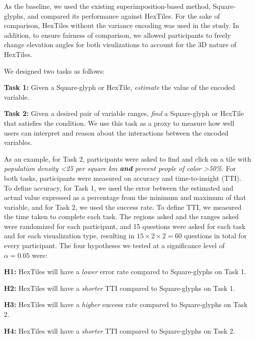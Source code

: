 As the baseline, we used the existing superimposition-based method, Square-glyphs, and compared its performance against HexTiles.
%
For the sake of comparison, HexTiles without the variance encoding was used in the study.
%
In addition, to ensure fairness of comparison, we allowed participants to freely change elevation angles for both visulizations to account for the 3D nature of HexTiles.


We designed two tasks as follows: 
\begin{tightItemize}
    \item \textbf{Task 1:} Given a Square-glyph or HexTile, \textit{estimate} the value of the encoded variable.
    \item \textbf{Task 2:} Given a desired pair of variable ranges, \textit{find} a Square-glyph or HexTile that satisfies the condition. We use this task as a proxy to measure how well users can interpret and reason about the interactions between the encoded variables.
\end{tightItemize}
As an example, for Task 2, participants were asked to find and click on a tile with \textit{population density <25 per square km \textbf{and} percent people of color >50\%}.
%
For both tasks, participants were measured on accuracy and time-to-insight (TTI).
%
To define accuracy, for Task 1, we used the error between the estimated and actual value expressed as a percentage from the minimum and maximum of that variable, and for Task 2, we used the success rate.
%
To define TTI, we measured the time taken to complete each task.
%
The regions asked and the ranges asked were randomized for each participant, and 15 questions were asked for each task and for each visualization type, resulting in $15 \times 2 \times 2 = 60$ questions in total for every participant.
%
The four hypotheses we tested at a significance level of $\alpha = 0.05$ were:
\begin{tightItemize}
    \item \textbf{H1:} HexTiles will have a \textit{lower} error rate compared to Square-glyphs on Task 1.
    \item \textbf{H2:} HexTiles will have a \textit{shorter} TTI compared to Square-glyphs on Task 1.
    \item \textbf{H3:} HexTiles will have a \textit{higher} success rate compared to Square-glyphs on Task 2.
    \item \textbf{H4:} HexTiles will have a \textit{shorter} TTI compared to Square-glyphs on Task 2.
\end{tightItemize}

